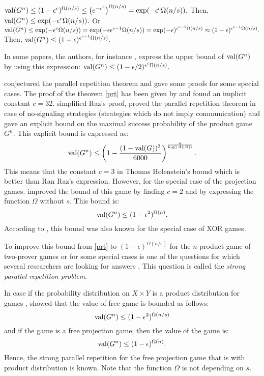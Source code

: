 $\mathrm{val} (G^n) \leq  (1-\epsilon^c)^{\Omega(n/s)}  \leq  \left(e^{-\epsilon^c}\right)^{\Omega(n/s)}  =  \exp (-\epsilon^c \Omega(n/s)).$
 Then, $\mathrm{val} (G^n) \leq \exp (-\epsilon^c \Omega(n/s)).$
Or $
\mathrm{val} (G^n) \leq  \exp (-\epsilon^c \Omega(n/s))   =  \exp (-\epsilon \epsilon^{c-1} \Omega(n/s)) = \exp (-\epsilon)^{\epsilon^{c-1} \Omega(n/s)}  \approx   (1-\epsilon)^{\epsilon^{c-1} \Omega(n/s)}.$ 
Then, $\mathrm{val} (G^n) \leq (1-\epsilon)^{\epsilon^{c-1} \Omega(n/s)}.$

In some papers, the authors, for instance \cite{rao2011parallel}, express the upper bound of $\mathrm{val} (G^n)$ by using this expression: $\mathrm{val} (G^n) \leq (1-{\epsilon}/{2})^{  \epsilon^{c} \Omega(n/s)}.$

\cite{feige1992two} conjectured the parallel repetition theorem and gave some proofs for some special cases. The proof of the theorem \eqref{prt}  has been given by \cite{raz1998parallel} and found an implicit constant   $c=32$.  \cite{holenstein2007parallel} simplified Raz's proof, proved the parallel repetition theorem in case of no-signaling strategies (strategies which do
not imply communication) and gave an explicit bound on the maximal success probability of the product game $G^n.$ This explicit bound is expressed as:
$$\mathrm{val} (G^n) \leq \left(1-\frac{(1-\mathrm{val} (G))^3}{6000} \right)^{\frac{n}{\log (|A||B|)}}.$$
This means that the constant $c=3$ in Thomas Holenstein's bound which is better than Ran Raz's expression. However, for the special case of the projection games. 
\cite{rao2011parallel} improved the bound of this game by finding $c=2$ and by expressing the function $\Omega$ without $s.$ This bound is: $$\mathrm{val} (G^n) \leq (1-\epsilon^2)^{\Omega(n)}.$$ According to \cite{raz2010parallel}, this bound was also known for the special case of XOR games.

To improve this bound from \eqref{prt} to $(1-\epsilon)^{\Omega(n/s)}$ for the $n$-product game of two-prover games or for some special cases  is one of the questions for which several researchers are looking for answers \citep{raz2010parallel}.  This question is called the \textit{strong parallel repetition problem}.

In case if the probability distribution on $X \times Y$ is a product distribution  for games , \cite{barak2009strong}  showed that the value of free game is bounded  as follows:
 $$\mathrm{val} (G^n) \leq (1-\epsilon^2)^{\Omega(n/s)}$$
 and if the game is a free projection game, then the value of the game is: $$\mathrm{val} (G^n) \leq (1-\epsilon)^{\Omega(n)}.$$
Hence, the strong parallel repetition for the free projection game that is with product distribution is known. Note that the function $\Omega$ is not depending on $s.$

